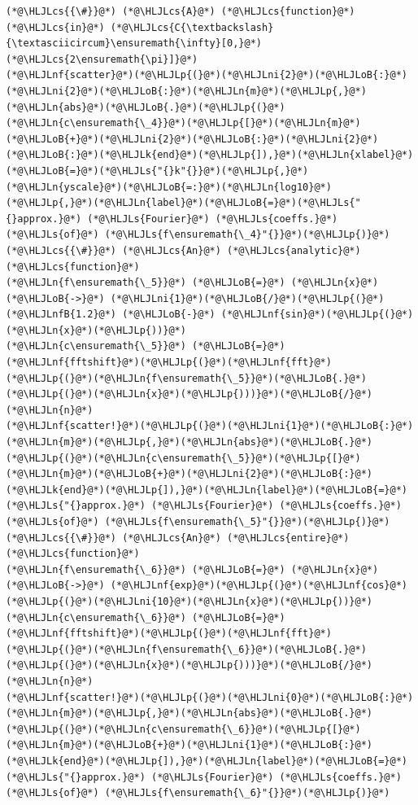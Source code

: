 \documentclass[12pt,landscape]{article}
\newcommand{\HLJLk}[1]{\textcolor[RGB]{148,91,176}{\textbf{#1}}}
\newcommand{\HLJLn}[1]{#1}
\newcommand{\HLJLnf}[1]{\textcolor[RGB]{66,102,213}{#1}}
\newcommand{\HLJLs}[1]{\textcolor[RGB]{201,61,57}{#1}}
\newcommand{\HLJLnfB}[1]{\textcolor[RGB]{59,151,46}{#1}}
\newcommand{\HLJLni}[1]{\textcolor[RGB]{59,151,46}{#1}}
\newcommand{\HLJLoB}[1]{\textcolor[RGB]{102,102,102}{\textbf{#1}}}
\newcommand{\HLJLp}[1]{#1}
\newcommand{\HLJLcs}[1]{\textcolor[RGB]{153,153,119}{\textit{#1}}}
\begin{document}
{\begin{lstlisting}
(*@\HLJLcs{{\#}}@*) (*@\HLJLcs{A}@*) (*@\HLJLcs{function}@*) (*@\HLJLcs{in}@*) (*@\HLJLcs{C{\textbackslash}{\textasciicircum}\ensuremath{\infty}[0,}@*) (*@\HLJLcs{2\ensuremath{\pi}]}@*)
(*@\HLJLnf{scatter}@*)(*@\HLJLp{(}@*)(*@\HLJLni{2}@*)(*@\HLJLoB{:}@*)(*@\HLJLni{2}@*)(*@\HLJLoB{:}@*)(*@\HLJLn{m}@*)(*@\HLJLp{,}@*)(*@\HLJLn{abs}@*)(*@\HLJLoB{.}@*)(*@\HLJLp{(}@*)(*@\HLJLn{c\ensuremath{\_4}}@*)(*@\HLJLp{[}@*)(*@\HLJLn{m}@*)(*@\HLJLoB{+}@*)(*@\HLJLni{2}@*)(*@\HLJLoB{:}@*)(*@\HLJLni{2}@*)(*@\HLJLoB{:}@*)(*@\HLJLk{end}@*)(*@\HLJLp{]),}@*)(*@\HLJLn{xlabel}@*)(*@\HLJLoB{=}@*)(*@\HLJLs{"{}k"{}}@*)(*@\HLJLp{,}@*)
(*@\HLJLn{yscale}@*)(*@\HLJLoB{=:}@*)(*@\HLJLn{log10}@*)(*@\HLJLp{,}@*)(*@\HLJLn{label}@*)(*@\HLJLoB{=}@*)(*@\HLJLs{"{}approx.}@*) (*@\HLJLs{Fourier}@*) (*@\HLJLs{coeffs.}@*) (*@\HLJLs{of}@*) (*@\HLJLs{f\ensuremath{\_4}"{}}@*)(*@\HLJLp{)}@*)
(*@\HLJLcs{{\#}}@*) (*@\HLJLcs{An}@*) (*@\HLJLcs{analytic}@*) (*@\HLJLcs{function}@*)
(*@\HLJLn{f\ensuremath{\_5}}@*) (*@\HLJLoB{=}@*) (*@\HLJLn{x}@*) (*@\HLJLoB{->}@*) (*@\HLJLni{1}@*)(*@\HLJLoB{/}@*)(*@\HLJLp{(}@*)(*@\HLJLnfB{1.2}@*) (*@\HLJLoB{-}@*) (*@\HLJLnf{sin}@*)(*@\HLJLp{(}@*)(*@\HLJLn{x}@*)(*@\HLJLp{))}@*)
(*@\HLJLn{c\ensuremath{\_5}}@*) (*@\HLJLoB{=}@*) (*@\HLJLnf{fftshift}@*)(*@\HLJLp{(}@*)(*@\HLJLnf{fft}@*)(*@\HLJLp{(}@*)(*@\HLJLn{f\ensuremath{\_5}}@*)(*@\HLJLoB{.}@*)(*@\HLJLp{(}@*)(*@\HLJLn{x}@*)(*@\HLJLp{)))}@*)(*@\HLJLoB{/}@*)(*@\HLJLn{n}@*)
(*@\HLJLnf{scatter!}@*)(*@\HLJLp{(}@*)(*@\HLJLni{1}@*)(*@\HLJLoB{:}@*)(*@\HLJLn{m}@*)(*@\HLJLp{,}@*)(*@\HLJLn{abs}@*)(*@\HLJLoB{.}@*)(*@\HLJLp{(}@*)(*@\HLJLn{c\ensuremath{\_5}}@*)(*@\HLJLp{[}@*)(*@\HLJLn{m}@*)(*@\HLJLoB{+}@*)(*@\HLJLni{2}@*)(*@\HLJLoB{:}@*)(*@\HLJLk{end}@*)(*@\HLJLp{]),}@*)(*@\HLJLn{label}@*)(*@\HLJLoB{=}@*)(*@\HLJLs{"{}approx.}@*) (*@\HLJLs{Fourier}@*) (*@\HLJLs{coeffs.}@*) (*@\HLJLs{of}@*) (*@\HLJLs{f\ensuremath{\_5}"{}}@*)(*@\HLJLp{)}@*)
(*@\HLJLcs{{\#}}@*) (*@\HLJLcs{An}@*) (*@\HLJLcs{entire}@*) (*@\HLJLcs{function}@*)
(*@\HLJLn{f\ensuremath{\_6}}@*) (*@\HLJLoB{=}@*) (*@\HLJLn{x}@*) (*@\HLJLoB{->}@*) (*@\HLJLnf{exp}@*)(*@\HLJLp{(}@*)(*@\HLJLnf{cos}@*)(*@\HLJLp{(}@*)(*@\HLJLni{10}@*)(*@\HLJLn{x}@*)(*@\HLJLp{))}@*)
(*@\HLJLn{c\ensuremath{\_6}}@*) (*@\HLJLoB{=}@*) (*@\HLJLnf{fftshift}@*)(*@\HLJLp{(}@*)(*@\HLJLnf{fft}@*)(*@\HLJLp{(}@*)(*@\HLJLn{f\ensuremath{\_6}}@*)(*@\HLJLoB{.}@*)(*@\HLJLp{(}@*)(*@\HLJLn{x}@*)(*@\HLJLp{)))}@*)(*@\HLJLoB{/}@*)(*@\HLJLn{n}@*)
(*@\HLJLnf{scatter!}@*)(*@\HLJLp{(}@*)(*@\HLJLni{0}@*)(*@\HLJLoB{:}@*)(*@\HLJLn{m}@*)(*@\HLJLp{,}@*)(*@\HLJLn{abs}@*)(*@\HLJLoB{.}@*)(*@\HLJLp{(}@*)(*@\HLJLn{c\ensuremath{\_6}}@*)(*@\HLJLp{[}@*)(*@\HLJLn{m}@*)(*@\HLJLoB{+}@*)(*@\HLJLni{1}@*)(*@\HLJLoB{:}@*)(*@\HLJLk{end}@*)(*@\HLJLp{]),}@*)(*@\HLJLn{label}@*)(*@\HLJLoB{=}@*)(*@\HLJLs{"{}approx.}@*) (*@\HLJLs{Fourier}@*) (*@\HLJLs{coeffs.}@*) (*@\HLJLs{of}@*) (*@\HLJLs{f\ensuremath{\_6}"{}}@*)(*@\HLJLp{)}@*)
\end{lstlisting}

}
\end{document}

